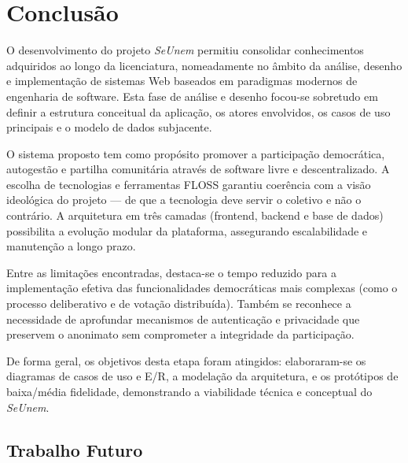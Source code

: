 \documentclass[12pt,a4paper,openright,oneside]{memoir}
\begin{document}
\chapter{Conclusão}
\label{ch:conclusion}



O desenvolvimento do projeto \textit{SeUnem} permitiu consolidar conhecimentos
adquiridos ao longo da licenciatura, nomeadamente no âmbito da análise,
desenho e implementação de sistemas Web baseados em paradigmas modernos de
engenharia de software. Esta fase de análise e desenho focou-se sobretudo em
definir a estrutura conceitual da aplicação, os atores envolvidos, os casos de
uso principais e o modelo de dados subjacente.

O sistema proposto tem como propósito promover a participação democrática,
autogestão e partilha comunitária através de software livre e descentralizado.
A escolha de tecnologias e ferramentas FLOSS garantiu coerência com a visão
ideológica do projeto — de que a tecnologia deve servir o coletivo e não o
contrário. A arquitetura em três camadas (frontend, backend e base de dados)
possibilita a evolução modular da plataforma, assegurando escalabilidade e
manutenção a longo prazo.

Entre as limitações encontradas, destaca-se o tempo reduzido para a
implementação efetiva das funcionalidades democráticas mais complexas (como o
processo deliberativo e de votação distribuída). Também se reconhece a
necessidade de aprofundar mecanismos de autenticação e privacidade que
preservem o anonimato sem comprometer a integridade da participação.

De forma geral, os objetivos desta etapa foram atingidos: elaboraram-se os
diagramas de casos de uso e E/R, a modelação da arquitetura, e os protótipos de
baixa/média fidelidade, demonstrando a viabilidade técnica e conceptual do
\textit{SeUnem}.

\section{Trabalho Futuro}
\end{document}
